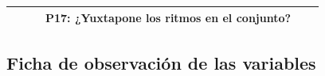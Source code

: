 \documentclass[12pt,a4paper]{article}
\begin{document}
\begin{landscape}
\begin{table}[ht!]
\begin{tabular}{|c|l|l|l|c|c|}
			                                                       &                           &                                    & P17: ¿Yuxtapone los ritmos en el conjunto?                      &                                                                                     &                                                                  \\\hline
		\end{tabular}
	\end{table}
\end{landscape}



\begin{landscape}
	\subsection{Ficha de observación de las variables}


\end{landscape}
\end{document}
